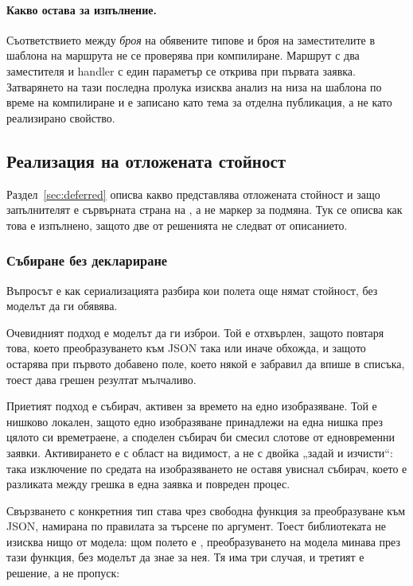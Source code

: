 \paragraph{Какво остава за изпълнение.} Съответствието между \emph{броя} на обявените типове
и броя на заместителите в шаблона на маршрута не се проверява при компилиране. Маршрут с два
заместителя и handler с един параметър се открива при първата заявка. Затварянето на тази
последна пролука изисква анализ на низа на шаблона по време на компилиране и е записано като
тема за отделна публикация, а не като реализирано свойство.

\subsection{Реализация на отложената стойност}
\label{sec:deferredimpl}

Раздел~\ref{sec:deferred} описва какво представлява отложената стойност и защо запълнителят е
сървърната страна на , а не маркер за подмяна. Тук се описва как това е
изпълнено, защото две от решенията не следват от описанието.

\subsubsection{Събиране без деклариране}

Въпросът е как сериализацията разбира кои полета още нямат стойност, без моделът да ги
обявява.

Очевидният подход е моделът да ги изброи. Той е отхвърлен, защото повтаря това, което
преобразуването към JSON така или иначе обхожда, и защото остарява при първото добавено поле,
което някой е забравил да впише в списъка, тоест дава грешен резултат мълчаливо.

Приетият подход е събирач, активен за времето на едно изобразяване. Той е нишково локален,
защото едно изобразяване принадлежи на една нишка през цялото си времетраене, а споделен
събирач би смесил слотове от едновременни заявки. Активирането е с област на видимост, а не с
двойка „задай и изчисти“: така изключение по средата на изобразяването не оставя увиснал
събирач, което е разликата между грешка в една заявка и повреден процес.

Свързването с конкретния тип става чрез свободна функция за преобразуване към JSON, намирана
по правилата за търсене по аргумент. Тоест библиотеката не изисква нищо от модела: щом полето
е , преобразуването на модела минава през тази функция, без моделът да знае
за нея. Тя има три случая, и третият е решение, а не пропуск:

